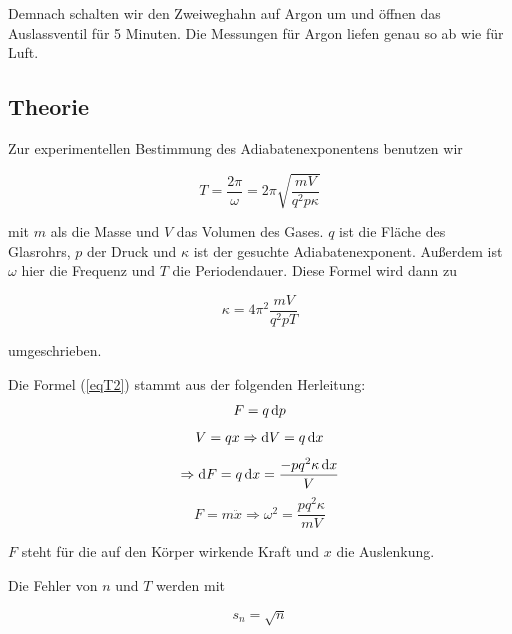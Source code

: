 \documentclass[11pt,a4paper]{article}
\newcommand\dif{\mathop{}\!\mathrm{d}}
\begin{document}
Demnach schalten wir den Zweiweghahn auf Argon um und öffnen das Auslassventil für 5 Minuten. Die Messungen für Argon liefen genau so ab wie für Luft. 

\subsection{Theorie}

Zur experimentellen Bestimmung des Adiabatenexponentens benutzen wir

\begin{equation}
T=\frac{2\pi}{\omega}=2\pi\sqrt{\frac{mV}{q^2p\kappa}}\label{eqT1}
\end{equation}

mit $m$ als die Masse und $V$ das Volumen des Gases. $q$ ist die Fl\"ache des Glasrohrs, $p$ der Druck und $\kappa$ ist der gesuchte Adiabatenexponent. Au\ss erdem ist $\omega$ hier die Frequenz und $T$ die Periodendauer. Diese Formel wird dann zu

\begin{equation}
\kappa=4\pi^2\frac{mV}{q^2pT}\label{eqT2}
\end{equation}

umgeschrieben.

Die Formel (\ref{eqT2}) stammt aus der folgenden Herleitung:
$$F=q\dif p\\
$$
$$V=qx\Rightarrow \dif V=q\dif x\\
$$
$$\Rightarrow \dif F=q\dif x=\frac{-pq^2\kappa\dif x}{V}\\
$$
$$F=m\ddot{x}\Rightarrow \omega^2=\frac{pq^2\kappa}{mV}
$$

$F$ steht f\"ur die auf den K\"orper wirkende Kraft und $x$ die Auslenkung.

Die Fehler von $n$ und $T$ werden mit

\begin{equation}
s_n=\sqrt{n}\label{equn}
\end{equation}
\end{document}
